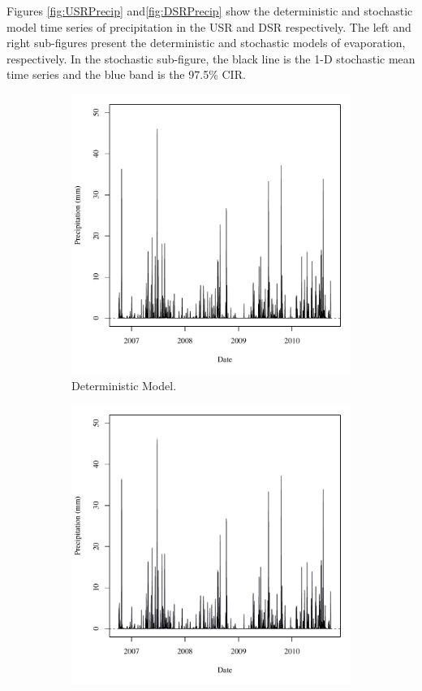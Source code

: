 \begin{linenumbers}
Figures \ref{fig:USRPrecip} and\ref{fig:DSRPrecip} show the deterministic and stochastic model time series of precipitation in the USR and DSR respectively.  The left and right sub-figures present the deterministic and stochastic models of evaporation, respectively.  In the stochastic sub-figure, the black line is the 1-D stochastic mean time series and the blue band is the 97.5\% CIR.  

\begin{figure}[htbp]
\centering
	\begin{subfigure}{0.5\textwidth}
		\includegraphics[width=0.9\linewidth]{"Figures/Results_DUSR/A Precip"}
		\caption{Deterministic Model.}
		\label{sub:USRPrecipD}
	\end{subfigure}%
	\begin{subfigure}{0.5\textwidth}
		\includegraphics[width=0.9\linewidth]{"Figures/Results_USR/A Precip"}

\end{subfigure}
\end{figure}
\end{linenumbers}
